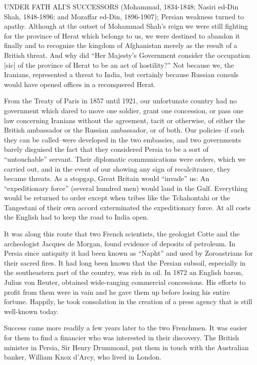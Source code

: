 
UNDER FATH ALI'S SUCCESSORS (Mohammad, 1834-1848; Nasiri ed-Din Shah, 1848-1896; and Mozaffar ed-Din, 1896-1907); Persian weakness turned to apathy. Although at the outset of Mohammad Shah's reign we were still fighting for the province of Herat which belongs to us, we were destined to abandon it finally and to recognize the kingdom of Afghanistan merely as the result of a British threat. And why did “Her Majesty's Government consider the occupation [sic] of the province of Herat to be an act of hostility?” Not because we, the Iranians, represented a threat to India, but certainly because Russian consuls would have opened offices in a reconquered Herat. 

From the Treaty of Paris in 1857 until 1921, our unfortunate country had no government which dared to move one soldier, grant one concession, or pass one law concerning Iranians without the agreement, tacit or otherwise, of either the British ambassador or the Russian ambassador, or of both. Our policies--if such they can be called--were developed in the two embassies, and two governments barely disguised the fact that they considered Persia to be a sort of “untouchable” servant. Their diplomatic communications were orders, which we carried out, and in the event of our showing any sign of recalcitrance, they became threats. As a stopgap, Great Britain would “invade” us: An “expeditionary force” (several hundred men) would land in the Gulf. Everything would be returned to order except when tribes like the Tchahontahi or the Tangestani of their own accord exterminated the expeditionary force. At all costs the English had to keep the road to India open. 


It was along this route that two French scientists, the geologist Cotte and the archeologist Jacques de Morgan, found evidence of deposits of petroleum. In Persia since antiquity it had been known as “Napht” and used by Zoroastrians for their sacred fires. It had long been known that the Persian subsoil, especially in the southeastern part of the country, was rich in oil. In 1872 an English baron, Julius von Reuter, obtained wide-ranging commercial concessions. His efforts to profit from them were in vain and he gave them up before losing his entire fortune. Happily, he took consolation in the creation of a press agency that is still well-known today. 

Success came more readily a few years later to the two Frenchmen. It was easier for them to find a financier who was interested in their discovery. The British minister in Persia, Sir Henry Drummond, put them in touch with the Australian banker, William Knox d'Arcy, who lived in London. 

